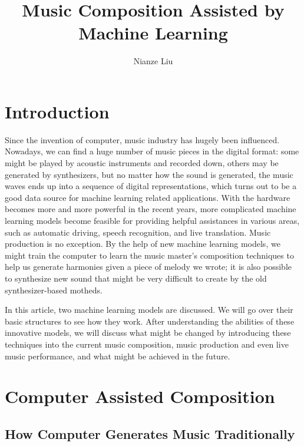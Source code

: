 \documentclass[jou]{apa6}
\title{Music Composition Assisted by Machine Learning}
\author{Nianze Liu}
\affiliation{New York University}
\begin{document}
\maketitle

\section{Introduction}

Since the invention of computer, music industry has hugely been influenced. Nowadays, we can find a huge number of music pieces in the digital format: some might be played by acoustic instruments and recorded down, others may be generated by synthesizers, but no matter how the sound is generated, the music waves ends up into a sequence of digital representations, which turns out to be a good data source for machine learning related applications. With the hardware becomes more and more powerful in the recent years, more complicated machine learning models become feasible for providing helpful assistances in various areas, such as automatic driving, speech recognition, and live translation. Music production is no exception. By the help of new machine learning models, we might train the computer to learn the music master's composition techniques to help us generate harmonies given a piece of melody we wrote; it is also possible to synthesize new sound that might be very difficult to create by the old synthesizer-based motheds.

In this article, two machine learning models are discussed. We will go over their basic structures to see how they work. After understanding the abilities of these innovative models, we will discuss what might be changed by introducing these techniques into the current music composition, music production and even live music performance, and what might be achieved in the future.

\section{Computer Assisted Composition}

\subsection{How Computer Generates Music Traditionally}
\end{document}
